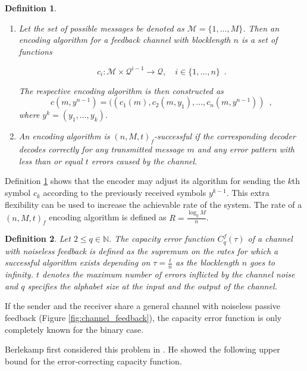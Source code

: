 \documentclass[conference]{IEEEtran}
\newtheorem{Definition}{Definition}
\def\NN{{\mathbb N}}
\begin{document}
\begin{Definition}\label{def:feedback_encoding}
\begin{enumerate}
	\item Let the set of possible messages be denoted as $\mathcal{M} = \{1,\dots,M\}$. Then an encoding algorithm for a feedback channel with blocklength $n$ is a set of functions
	
	\begin{equation}
	c_i: \mathcal{M} \times \mathcal{Q}^{i-1} \rightarrow \mathcal{Q}, \quad i \in \{1,\dots,n\} \enspace .
	\end{equation}
	
	The respective encoding algorithm is then constructed as
	\begin{equation}
	c(m,y^{n-1}) = ((c_1(m), c_2(m,y_1), \dots, c_n(m,y^{n-1})) \enspace ,
	\end{equation}
	where $y^k = (y_1,\dots,y_k)$.
	\item An encoding algorithm is $(n,M,t)_f$-successful if the corresponding decoder decodes correctly for any transmitted message $m$ and any error pattern with less than or equal $t$ errors caused by the channel.
	\end{enumerate}
\end{Definition}


Definition \ref{def:feedback_encoding} shows that the encoder may adjust its algorithm for sending the $k$th symbol $c_k$ according to the previously received symbols $y^{k-1}$. This extra flexibility can be used to increase the achievable rate of the system.
The rate of a  $(n,M,t)_f$ encoding algorithm is defined as $R=\frac {\log_q M}n$.
\begin{Definition}
	Let $2\leq q\in\NN$. The capacity error function $C_q^f(\tau)$ of a channel with noiseless feedback is defined as the supremum on the rates for which a successful algorithm exists depending on $\tau=\frac{t}{n}$ as the blocklength $n$ goes to infinity. $t$ denotes the maximum number of errors inflicted by the channel noise and $q$ specifies the alphabet size at the input and the output of the channel.
	

\end{Definition}
If the sender and the receiver share a general channel with noiseless passive feedback (Figure \ref{fig:channel_feedback}), the capacity error function is only completely known for the binary case.

Berlekamp first considered this problem in \cite{B68}. He showed the following upper bound for the error-correcting capacity function.
\end{document}
